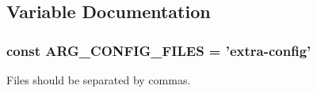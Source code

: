 \subsection{Variable Documentation}
\hypertarget{group__args_ga87849d19fd64c989a9562207edb3d6f5}{
\subsubsection[{A\-R\-G\-\_\-\-C\-O\-N\-F\-I\-G\-\_\-\-F\-I\-L\-E\-S}]{\setlength{\rightskip}{0pt plus 5cm}const A\-R\-G\-\_\-\-C\-O\-N\-F\-I\-G\-\_\-\-F\-I\-L\-E\-S = 'extra-\/config'}}\label{group__args_ga87849d19fd64c989a9562207edb3d6f5}
Files should be separated by commas.

